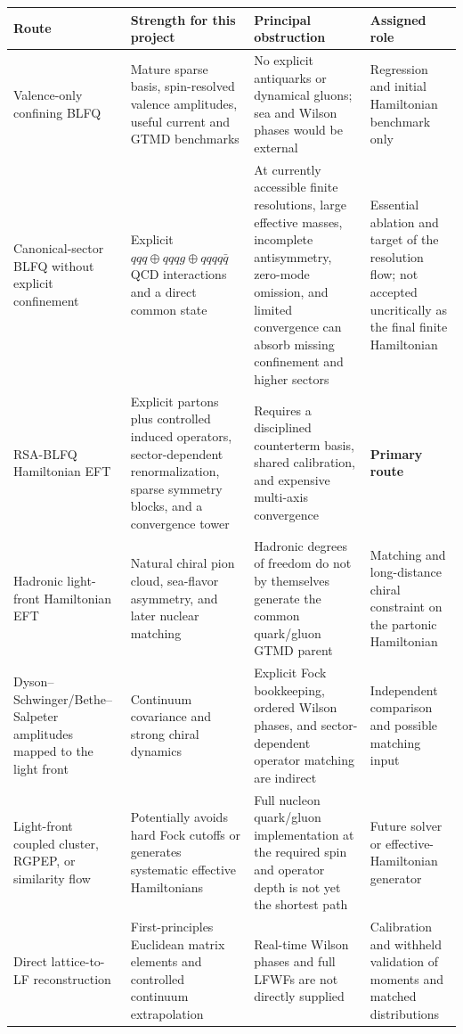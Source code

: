 \documentclass[11pt]{article}
\begin{document}
\begin{longtable}{L{0.19\textwidth}L{0.25\textwidth}L{0.25\textwidth}L{0.20\textwidth}}
\toprule
Route & Strength for this project & Principal obstruction & Assigned role\\
\midrule
\endhead
Valence-only confining BLFQ & Mature sparse basis, spin-resolved valence
amplitudes, useful current and GTMD benchmarks & No explicit antiquarks or
dynamical gluons; sea and Wilson phases would be external & Regression and
initial Hamiltonian benchmark only\\
Canonical-sector BLFQ without explicit confinement & Explicit
\(qqq\oplus qqqg\oplus qqqq\bar q\) QCD interactions and a direct common state
& At currently accessible finite resolutions, large effective masses,
incomplete antisymmetry, zero-mode omission, and limited convergence can absorb
missing confinement and higher sectors & Essential ablation and target of the
resolution flow; not accepted uncritically as the final finite Hamiltonian\\
RSA-BLFQ Hamiltonian EFT & Explicit partons plus controlled induced operators,
sector-dependent renormalization, sparse symmetry blocks, and a convergence
tower & Requires a disciplined counterterm basis, shared calibration, and
expensive multi-axis convergence & \textbf{Primary route}\\
Hadronic light-front Hamiltonian EFT & Natural chiral pion cloud, sea-flavor
asymmetry, and later nuclear matching & Hadronic degrees of freedom do not by
themselves generate the common quark/gluon GTMD parent & Matching and
long-distance chiral constraint on the partonic Hamiltonian\\
Dyson--Schwinger/Bethe--Salpeter amplitudes mapped to the light front &
Continuum covariance and strong chiral dynamics & Explicit Fock bookkeeping,
ordered Wilson phases, and sector-dependent operator matching are indirect &
Independent comparison and possible matching input\\
Light-front coupled cluster, RGPEP, or similarity flow & Potentially avoids hard
Fock cutoffs or generates systematic effective Hamiltonians & Full nucleon
quark/gluon implementation at the required spin and operator depth is not yet
the shortest path & Future solver or effective-Hamiltonian generator\\
Direct lattice-to-LF reconstruction & First-principles Euclidean matrix
elements and controlled continuum extrapolation & Real-time Wilson phases and
full LFWFs are not directly supplied & Calibration and withheld validation of
moments and matched distributions\\
\bottomrule
\end{longtable}
\end{document}
